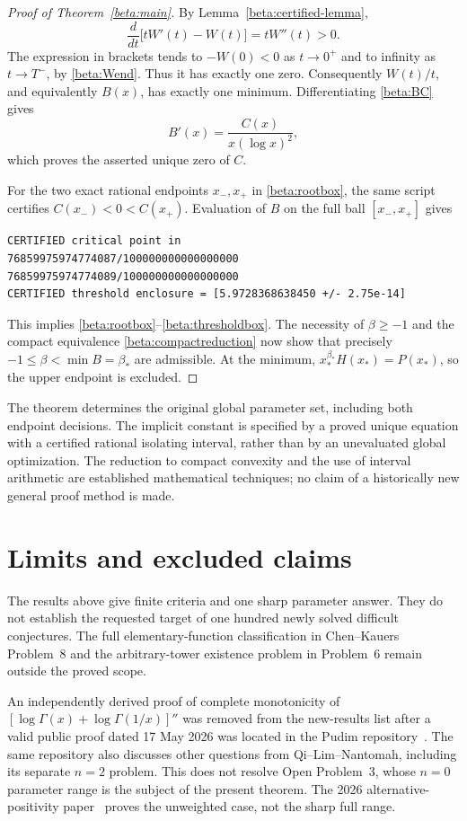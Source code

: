 \begin{proof}[Proof of Theorem~\ref{beta:main}]
By Lemma~\ref{beta:certified-lemma},
\[
 \frac d{dt}\bigl[tW'(t)-W(t)\bigr]=tW''(t)>0.
\]
The expression in brackets tends to $-W(0)<0$ as $t\to0^+$ and to
infinity as $t\to T^-$, by \eqref{beta:Wend}. Thus it has exactly one
zero. Consequently $W(t)/t$, and equivalently $B(x)$, has exactly one
minimum. Differentiating \eqref{beta:BC} gives
\[
 B'(x)=\frac{C(x)}{x(\log x)^2},
\]
which proves the asserted unique zero of $C$.

For the two exact rational endpoints $x_-,x_+$ in
\eqref{beta:rootbox}, the same script certifies
$C(x_-)<0<C(x_+)$. Evaluation of $B$ on the full ball
$[x_-,x_+]$ gives
\begin{verbatim}
CERTIFIED critical point in
76859975974774087/100000000000000000
76859975974774089/100000000000000000
CERTIFIED threshold enclosure = [5.9728368638450 +/- 2.75e-14]
\end{verbatim}
This implies \eqref{beta:rootbox}--\eqref{beta:thresholdbox}.
The necessity of $\beta\geq-1$ and the compact equivalence
\eqref{beta:compactreduction} now show that precisely
$-1\leq\beta<\min B=\beta_*$ are admissible. At the minimum,
$x_*^{\beta_*}H(x_*)=P(x_*)$, so the upper endpoint is excluded.
\end{proof}

\begin{remark}\label{beta:scope}
The theorem determines the original global parameter set, including both
endpoint decisions. The implicit constant is specified by a proved unique
equation with a certified rational isolating interval, rather than by an
unevaluated global optimization. The reduction to compact convexity and the
use of interval arithmetic are established mathematical techniques; no claim
of a historically new general proof method is made.
\end{remark}


\section{Limits and excluded claims}
The results above give finite criteria and one sharp parameter answer.
They do not establish the requested target of one hundred newly solved
difficult conjectures. The full elementary-function classification in
Chen--Kauers Problem~8 and the arbitrary-tower existence problem in
Problem~6 remain outside the proved scope.

An independently derived proof of complete monotonicity of
$[\log\Gamma(x)+\log\Gamma(1/x)]''$ was removed from the new-results
list after a valid public proof dated 17 May 2026 was located in the
Pudim repository~\cite{Pudim}. The same repository also discusses other
questions from Qi--Lim--Nantomah, including its separate $n=2$ problem.
This does not resolve Open Problem~3, whose $n=0$ parameter range is
the subject of the present theorem. The 2026 alternative-positivity
paper~\cite{SLQ2026} proves the unweighted case, not the sharp full range.

